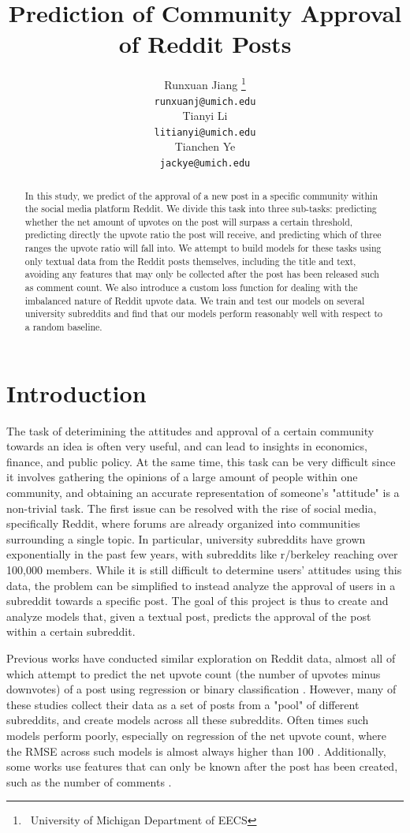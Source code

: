 \documentclass[11pt,a4paper]{article}
\title{Prediction of Community Approval of Reddit Posts}
\author{Runxuan Jiang \thanks{\, University of Michigan Department of EECS} \\
  \texttt{runxuanj@umich.edu} \\
  \And
  Tianyi Li \footnotemark[1]\\
  \texttt{litianyi@umich.edu} \\
  \And 
  Tianchen Ye \footnotemark[1]\\
  \texttt{jackye@umich.edu}}
\date{}
\let\Oldsection\section
\renewcommand{\section}{\FloatBarrier\Oldsection}
\begin{document}
\maketitle
\begin{abstract}
    In this study, we predict of the approval of a new post in a specific community within the social media platform Reddit. We divide this task into three sub-tasks: predicting whether the net amount of upvotes on the post will surpass a certain threshold, predicting directly the upvote ratio the post will receive, and predicting which of three ranges the upvote ratio will fall into. We attempt to build models for these tasks using only textual data from the Reddit posts themselves, including the title and text, avoiding any features that may only be collected after the post has been released such as comment count. We also introduce a custom loss function for dealing with the imbalanced nature of Reddit upvote data. We train and test our models on several university subreddits and find that our models perform reasonably well with respect to a random baseline.
\end{abstract}

\Oldsection{Introduction}
    The task of deterimining the attitudes and approval of a certain community towards an idea is often very useful, and can lead to insights in economics, finance, and public policy. At the same time, this task can be very difficult since it involves gathering the opinions of a large amount of people within one community, and obtaining an accurate representation of someone's "attitude" is a non-trivial task. The first issue can be resolved with the rise of social media, specifically Reddit, where forums are already organized into communities surrounding a single topic. In particular, university subreddits have grown exponentially in the past few years, with subreddits like r/berkeley reaching over 100,000 members. While it is still difficult to determine users' attitudes using this data, the problem can be simplified to instead analyze the approval of users in a subreddit towards a specific post. The goal of this project is thus to create and analyze models that, given a textual post, predicts the approval of the post within a certain subreddit. 

    Previous works have conducted similar exploration on Reddit data, almost all of which attempt to predict the net upvote count (the number of upvotes minus downvotes) of a post using regression or binary classification \citep{Segall2012,Shuaibi2019,Terentiev2014}. However, many of these studies collect their data as a set of posts from a "pool" of different subreddits, and create models across all these subreddits. Often times such models perform poorly, especially on regression of the net upvote count, where the RMSE across such models is almost always higher than 100 \citep{Segall2012,Shuaibi2019}. Additionally, some works use features that can only be known after the post has been created, such as the number of comments \citep{Shuaibi2019}.
\end{document}
